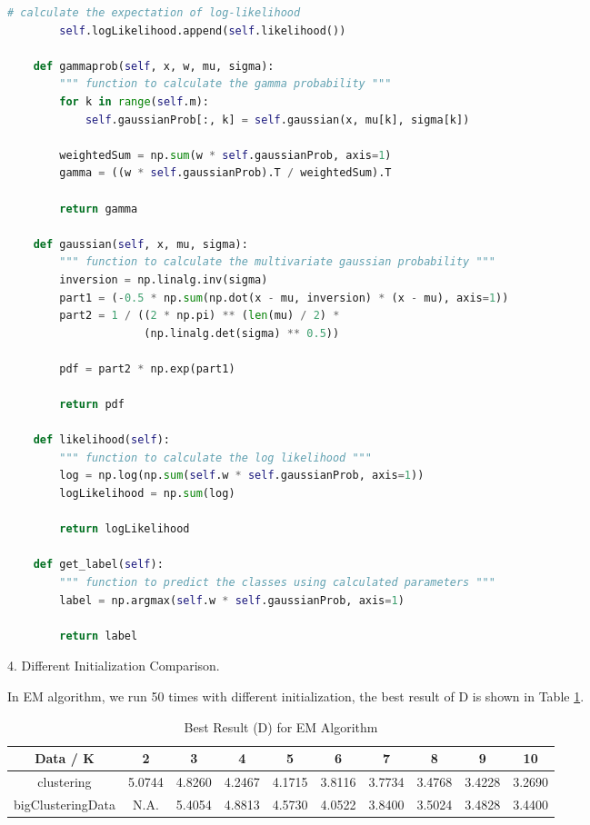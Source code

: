 \begin{description}
\begin{description}
\begin{lstlisting}[language=Python, caption=EM Algorithm Python Code]
        # calculate the expectation of log-likelihood
        self.logLikelihood.append(self.likelihood())

    def gammaprob(self, x, w, mu, sigma):
        """ function to calculate the gamma probability """
        for k in range(self.m):
            self.gaussianProb[:, k] = self.gaussian(x, mu[k], sigma[k])

        weightedSum = np.sum(w * self.gaussianProb, axis=1)
        gamma = ((w * self.gaussianProb).T / weightedSum).T

        return gamma

    def gaussian(self, x, mu, sigma):
        """ function to calculate the multivariate gaussian probability """
        inversion = np.linalg.inv(sigma)
        part1 = (-0.5 * np.sum(np.dot(x - mu, inversion) * (x - mu), axis=1))
        part2 = 1 / ((2 * np.pi) ** (len(mu) / 2) *
                     (np.linalg.det(sigma) ** 0.5))

        pdf = part2 * np.exp(part1)

        return pdf

    def likelihood(self):
        """ function to calculate the log likelihood """
        log = np.log(np.sum(self.w * self.gaussianProb, axis=1))
        logLikelihood = np.sum(log)

        return logLikelihood

    def get_label(self):
        """ function to predict the classes using calculated parameters """
        label = np.argmax(self.w * self.gaussianProb, axis=1)

        return label
\end{lstlisting}

\item{4.} Different Initialization Comparison.

In EM algorithm, we run 50 times with different initialization, the best result of D is shown in Table \ref{table:best_EM}.

\begin{table}[H]
	\centering
	\caption{Best Result (D) for EM Algorithm}
	\label{table:best_EM}	
	\begin{tabular}{ c | c | c | c | c | c | c | c | c | c}
		\hline \hline
		Data / K      & 2     &    3    & 4    & 5     & 6    & 7    & 8   & 9    & 10 \\[0.1cm]
		\hline
	clustering	        & 5.0744 &    4.8260 & 4.2467 & 4.1715 & 3.8116 & 3.7734 & 3.4768 & 3.4228 & 3.2690 \\[0.1cm]
bigClusteringData & N.A. &    5.4054 & 4.8813 & 4.5730 & 4.0522 & 3.8400 & 3.5024 & 3.4828 & 3.4400 \\[0.1cm]
		\hline	
	\end{tabular}
\end{table}


\end{description}
\end{description}
